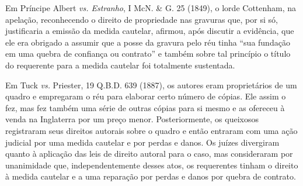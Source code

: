 Em Príncipe Albert \emph{vs. Estranho}, I McN. \& G. 25 (1849), o lorde
Cottenham, na apelação, reconhecendo o direito de propriedade nas
gravuras que, por si só, justificaria a emissão da medida cautelar,
afirmou, após discutir a evidência, que ele era obrigado a assumir que a
posse da gravura pelo réu tinha ``sua fundação em uma quebra de
confiança ou contrato'' e também sobre tal princípio o título do
requerente para a medida cautelar foi totalmente sustentada.

Em Tuck \emph{vs.} Priester, 19 Q.B.D. 639 (1887), os autores eram
proprietários de um quadro e empregaram o réu para elaborar certo número
de cópias. Ele assim o fez, mas fez também uma série de outras cópias
para si mesmo e as ofereceu à venda na Inglaterra por um preço menor.
Posteriormente, os queixosos registraram seus direitos autorais sobre o
quadro e então entraram com uma ação judicial por uma medida cautelar e
por perdas e danos. Os juízes divergiram quanto à aplicação das leis de
direito autoral para o caso, mas consideraram por unanimidade que,
independentemente desses atos, os requerentes tinham o direito à medida
cautelar e a uma reparação por perdas e danos por quebra de contrato.

